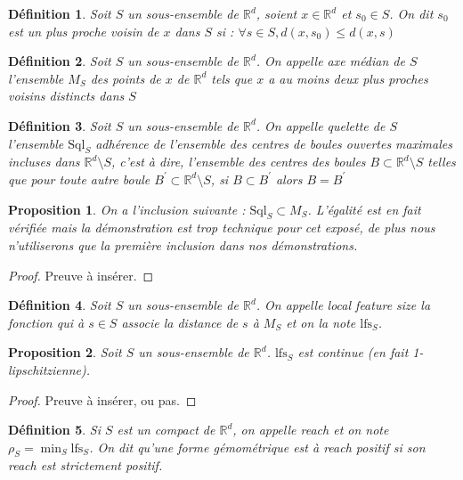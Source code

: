 \documentclass{report}
\newcommand{\R}{\mathbb{R}}
\newcommand{\Sql}{\mathrm{Sql}}
\newcommand{\lfs}{\mathrm{lfs}}
\newtheorem{definition}{Définition}
\newtheorem{prop}{Proposition}
\theoremstyle{remark}
\begin{document}
\begin{definition}
	Soit $S$ un sous-ensemble de $\R^d$, soient $x\in\R^d$ et $s_0\in S$. On dit $s_0$ est un \textnormal{plus proche voisin} de $x$ dans $S$ si : $\forall s\in S, d(x, s_0) \leq d(x, s)$
\end{definition}
	 
\begin{definition}
	Soit $S$ un sous-ensemble de $\R^d$. On appelle \textnormal{axe médian} de $S$ l'ensemble $M_S$ des points de $x$ de $\R^d$ tels que $x$ a au moins deux plus proches voisins distincts dans $S$
\end{definition}

\begin{definition}
	Soit $S$ un sous-ensemble de $\R^d$. On appelle \textnormal{quelette} de $S$ l'ensemble $\Sql_S$ adhérence de l'ensemble des centres de boules ouvertes maximales incluses dans $\R^d\setminus S$, c'est à dire, l'ensemble des centres des boules $B\subset\R^d\setminus S$ telles que pour toute autre boule $B^\prime\subset\R^d\setminus S$, si $B\subset B^\prime$ alors $B=B^\prime$
\end{definition}

\begin{prop}
	On a l'inclusion suivante : $\Sql_S\subset M_S$. L'égalité est en fait vérifiée mais la démonstration est trop technique pour cet exposé, de plus nous n'utiliserons que la première inclusion dans nos démonstrations.
\end{prop}

\begin{proof}
	Preuve à insérer.
\end{proof}

\begin{definition}
	Soit $S$ un sous-ensemble de $\R^d$. On appelle \textnormal{local feature size} la fonction qui à $s\in S$ associe la distance de $s$ à $M_S$ et on la note $\mathrm{lfs}_S$.
\end{definition}

\begin{prop}
	Soit $S$ un sous-ensemble de $\R^d$. $\lfs_S$ est continue (en fait 1-lipschitzienne).
\end{prop}

\begin{proof}
	Preuve à insérer, ou pas.
\end{proof}

\begin{definition}
	Si $S$ est un compact de $\R^d$, on appelle \textnormal{reach} et on note $\rho_S = \min_S\mathrm{lfs}_S$. On dit qu'une forme gémométrique est à \textnormal{reach positif} si son reach est strictement positif.
\end{definition}
\end{document}
